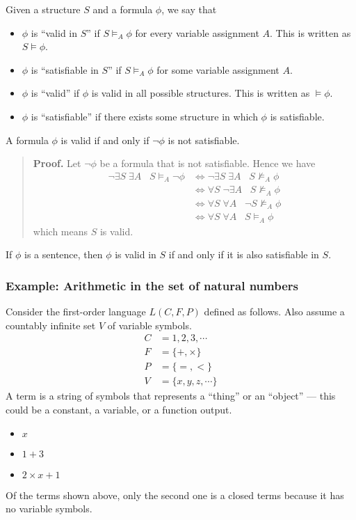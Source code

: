 Given a structure \(S\) and a formula \(\phi\), we say that
%
\begin{itemize}
    \item \(\phi\) is ``valid in \(S\)'' if \(S \models_A \phi\) for every variable assignment \(A\). This is written as \(S \models \phi\).
    \item \(\phi\) is ``satisfiable in \(S\)'' if \(S \models_A \phi\) for some variable assignment \(A\).
    \item \(\phi\) is ``valid'' if \(\phi\) is valid in all possible structures. This is written as \(\models \phi\).
    \item \(\phi\) is ``satisfiable'' if there exists some structure in which \(\phi\) is satisfiable.
\end{itemize}
%
A formula \(\phi\) is valid if and only if \(\neg \phi\) is not satisfiable.
%
\begin{quote}
    \textbf{Proof.} Let \(\neg\phi\) be a formula that is not satisfiable. Hence we have
    \begin{align*}
        \neg \exists S\; \exists A\;\;\; S \models_A \neg\phi &\iff \neg \exists S\; \exists A\;\;\; S \not\models_A \phi\\
        &\iff \forall S\; \neg \exists A\;\;\; S \not\models_A \phi\\
        &\iff \forall S\; \forall A\;\;\;  \neg S \not\models_A \phi\\
        &\iff \forall S\; \forall A\;\;\; S \models_A \phi
    \end{align*}
    which means \(S\) is valid.
\end{quote}

If \(\phi\) is a sentence, then \(\phi\) is valid in \(S\) if and only if it is also satisfiable in \(S\).



\subsubsection{Example: Arithmetic in the set of natural numbers}

Consider the first-order language \(L(C, F, P)\) defined as follows. Also assume a countably infinite set \(V\) of variable symbols.
%
\begin{align*}
    C &= 1, 2, 3, \cdots \tag{constant symbols}\\
    F &= \{+, \times\} \tag{function symbols, both binary}\\
    P &= \{=, <\} \tag{predicate symbols, both binary}\\
    V &= \{x, y, z, \cdots\} \tag{variable symbols}
\end{align*}
%
A term is a string of symbols that represents a ``thing'' or an ``object'' --- this could be a constant, a variable, or a function output.
%
\begin{itemize}
    \item \(x\)
    \item \(1 + 3\)
    \item \(2 \times x + 1\)
\end{itemize}
%
Of the terms shown above, only the second one is a closed terms because it has no variable symbols.


